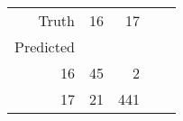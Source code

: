 \begin{tabular}{rrrrr}
\toprule
Truth & 16 & 17 \\
Predicted &  &  \\
\midrule
16 & 45 & 2 \\
17 & 21 & 441 \\
\bottomrule
\end{tabular}
